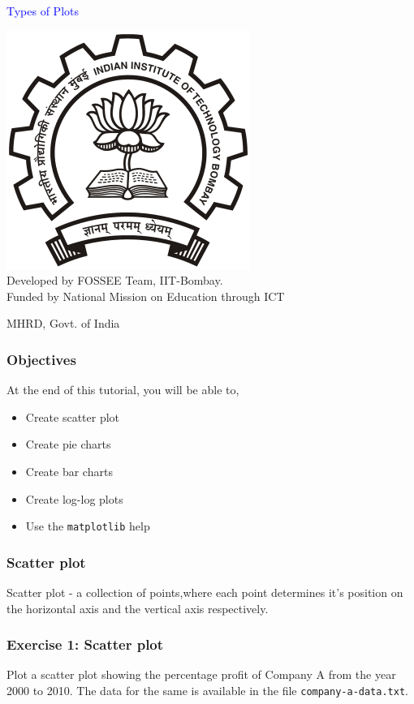\documentclass[presentation]{beamer}
\title{}
\author{FOSSEE}
\date{}
\begin{document}
\begin{frame}

\begin{center}
\textcolor{blue}{Types of Plots}
\end{center}
\begin{center}
\includegraphics[scale=0.25]{../images/iitb-logo.png}\\
Developed by FOSSEE Team, IIT-Bombay. \\ 
Funded by National Mission on Education through ICT

MHRD, Govt. of India
\end{center}
\end{frame}
\begin{frame}
\frametitle{Objectives}
\label{sec-2}

  At the end of this tutorial, you will be able to, 


\begin{itemize}
\item Create scatter plot
\item Create pie charts
\item Create bar charts
\item Create log-log plots
\item Use the \verb~matplotlib~ help
\end{itemize}
\end{frame}
\begin{frame}
\frametitle{Scatter plot}
\label{sec-3}

  Scatter plot - a collection of points,where each point determines
  it's position on the horizontal axis and the vertical axis 
  respectively.
\end{frame}
\begin{frame}
\frametitle{Exercise 1: Scatter plot}
\label{sec-4}

  Plot a scatter plot showing the percentage profit of Company A from the year 2000
  to 2010. The data for the same is available in the file \verb~company-a-data.txt~.
\end{frame}
\end{document}
